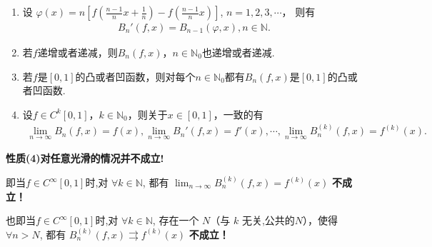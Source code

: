 \documentclass[../../main.tex]{subfiles}
\begin{document}
\begin{theorem}[Bernstein多项式的性质]\label{theorem:Bernstein多项式的性质}
\begin{enumerate}[(1)]
\item 设
\(\varphi(x)=n\left[f\left(\frac{n - 1}{n}x+\frac{1}{n}\right)-f\left(\frac{n - 1}{n}x\right)\right]\), \(n = 1,2,3,\cdots\)，
则有
\begin{align}\label{equation--Bernstein多项式性质13.115}
B_n'(f,x)=B_{n - 1}(\varphi,x),n\in\mathbb{N}.
\end{align}

\item 若\(f\)递增或者递减，则\(B_n(f,x)\)，\(n\in\mathbb{N}_0\)也递增或者递减.

\item 若\(f\)是\([0,1]\)的凸或者凹函数，则对每个\(n\in\mathbb{N}_0\)都有\(B_n(f,x)\)是\([0,1]\)的凸或者凹函数.

\item 设\(f\in C^k[0,1]\)，\(k\in\mathbb{N}_0\)，则关于\(x\in[0,1]\)，一致的有
\begin{align}\label{equation--Bernstein多项式性质13.116}
\lim_{n\rightarrow\infty}B_n(f,x)=f(x),\lim_{n\rightarrow\infty}B_n'(f,x)=f'(x),\cdots,\lim_{n\rightarrow\infty}B_n^{(k)}(f,x)=f^{(k)}(x).
\end{align}
\end{enumerate} 
\end{theorem}
\begin{remark}
\textbf{性质(4)对任意光滑的情况并不成立!}

即当$f\in C^{\infty}[0,1]$时,对 $\forall k\in \mathbb{N}$, 都有 $\lim_{n\rightarrow \infty}B_{n}^{( k )}( f,x ) =f^{( k )}( x )$ \textbf{不成立！}

也即当$f\in C^{\infty}[0,1]$时,对 $\forall k\in \mathbb{N}$, 存在一个 $N$（与 $k$ 无关,公共的$N$），使得 $\forall n>N$, 都有 $B_{n}^{( k )}( f,x ) \rightrightarrows f^{( k )}( x )$ \textbf{不成立！}
\end{remark}
\end{document}
